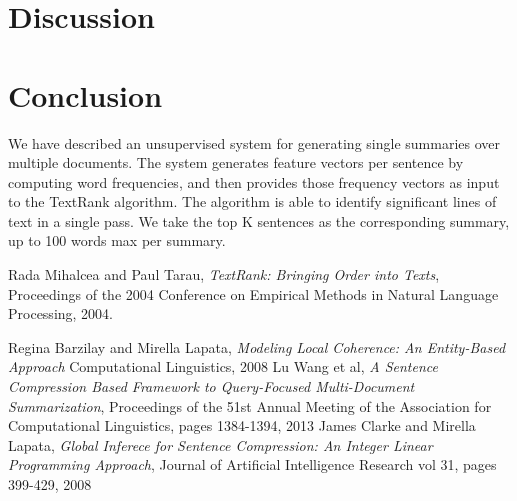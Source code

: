 \documentclass[11pt]{article}
\begin{document}
\section{Discussion}




\section{Conclusion}
 We have described an unsupervised system for generating single summaries over multiple documents. The system generates feature vectors per sentence by computing word frequencies, and then provides those frequency vectors as input to the TextRank algorithm. The algorithm is able to identify significant lines of text in a single pass. We take the top K sentences as the corresponding summary, up to 100 words max per summary.

%
%
\begin{thebibliography}{}

	Rada Mihalcea and Paul Tarau,
	\textit{TextRank: Bringing Order into Texts},
	Proceedings of the 2004 Conference on Empirical Methods in Natural Language Processing,
	2004.

    Regina Barzilay and Mirella Lapata,
    \textit{Modeling Local Coherence: An Entity-Based Approach}
    Computational Linguistics, 
    2008
	Lu Wang et al,
	\textit{A Sentence Compression Based Framework to Query-Focused Multi-Document Summarization},
	Proceedings of the 51st Annual Meeting of the Association for Computational Linguistics, pages 1384-1394,
	2013
	James Clarke and Mirella Lapata,
	\textit{Global Inferece for Sentence Compression: An Integer Linear Programming Approach},
	Journal of Artificial Intelligence Research vol 31, pages 399-429,
	2008

\end{thebibliography}
\end{document}

